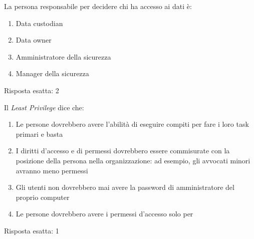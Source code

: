 \label{EsBCDR3}


\begin{Exercise} [
  title={Gestione dei dati},
  label={bcdr6}
 ]
 
 \Question La persona responsabile per decidere chi ha accesso ai dati è:
 \begin{enumerate}
   \item Data custodian
   \item Data owner
   \item Amministratore della sicurezza
   \item Manager della sicurezza
 \end{enumerate}
\end{Exercise}


\begin{Answer} [
  ref={bcdr6},
  number={6}
  ]
  
  \Question Risposta esatta: 2
  
\end{Answer}


\begin{Exercise} [
  title={Gestione dei dati},
  label={bcdr6}
  ]
  
  \Question Il \textit{Least Privilege} dice che:
  \begin{enumerate}
    \item Le persone dovrebbero avere l'abilità di eseguire compiti per fare i 
    loro task primari e basta
    \item I diritti d'accesso e di permessi dovrebbero essere commisurate con 
    la posizione della persona nella organizzazione: ad esempio, gli avvocati 
    minori avranno meno permessi
    \item Gli utenti non dovrebbero mai avere la password di amministratore del 
    proprio computer
    \item Le persone dovrebbero avere i permessi d'accesso solo per %
  \end{enumerate}
\end{Exercise}


\begin{Answer} [
  ref={bcdr6},
  number={6}
  ]
  
  \Question Risposta esatta: 1
  
\end{Answer}


